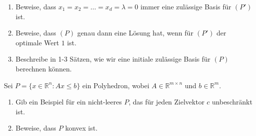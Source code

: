 \documentclass{uebung_cs}
\begin{document}
\begin{exercise}
	\begin{enumerate}
		\item\easy Beweise, dass $x_1 = x_2 = \dots = x_d = \lambda = 0$ immer eine zulässige Basis für $(P')$ ist.
		\item\medium Beweise, dass $(P)$ genau dann eine Lösung hat, wenn für $(P')$ der optimale Wert $1$ ist.
		\item\hard Beschreibe in 1-3 Sätzen, wie wir eine initiale zulässige Basis für $(P)$ berechnen können.
	\end{enumerate}
\end{exercise}

\begin{exercise}[Polyeder][\atschool]
	Sei $P=\{ x\in \mathbb{R}^n : Ax\leq b \}$ ein Polyhedron, wobei $A\in \mathbb{R}^{m\times n}$ und $b\in \mathbb{R}^m$.
	\begin{enumerate}
		\item\easy Gib ein Beispiel für ein nicht-leeres $P$, das für jeden Zielvektor $c$ unbeschränkt ist.
		\item\hard Beweise, dass $P$ konvex ist.
	\end{enumerate}
\end{exercise}
\end{document}
